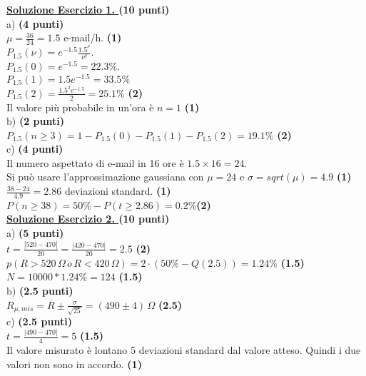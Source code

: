 \documentclass[10pt,a4paper,fleqn]{article}
\begin{document}
\vskip0.30cm {\bf \underline {Soluzione Esercizio 1. } } {\bf (10 punti)}\\
a) {\bf (4 punti)}\\
  $\mu =\frac{36}{24} = 1.5 $ e-mail/h. {\bf(1)} \\
  $P_{1.5}(\nu)=e^{-1.5}\frac{1.5^{\nu}}{\nu!}$. \\
  $P_{1.5}(0)= e^{-1.5} = 22.3\%$.\\
  $P_{1.5}(1)= 1.5 e^{-1.5} = 33.5\%$\\
  $P_{1.5}(2)= \frac{1.5^2 e^{-1.5}}{2} = 25.1\%$ {\bf (2)}\\
  Il valore pi\`u probabile in un'ora \`e $n = 1$ {\bf (1)}\\  
b) {\bf (2 punti)} \\ 
   $P_{1.5}(n\geq 3) = 1 - P_{1.5}(0) - P_{1.5}(1) - P_{1.5}(2) = 19.1\%$ {\bf (2)} \\
c) {\bf (4 punti)} \\ 
Il numero aspettato di e-mail in 16 ore \`e $1.5\times 16 = 24$. \\
Si pu\`o usare l'approssimazione gaussiana con $\mu = 24$ e $\sigma =
sqrt(\mu) = 4.9$ {\bf (1)}\\
$\frac{38-24}{4.9} = 2.86$ deviazioni standard. {\bf (1)}\\
$P(n\geq 38) = 50\% - P(t\geq 2.86) = 0.2\%${\bf (2)}\\

\vskip0.30cm {\bf \underline {Soluzione Esercizio 2. } } {\bf (10 punti)}\\
a) {\bf (5 punti)}\\
  $t=\frac{|520-470|}{20}=\frac{|420-470|}{20}=2.5$ {\bf(2)} \\
  $p(R>520 \,\Omega \, o \, R<420 \,\Omega)=2\cdot (50\%-Q(2.5))=1.24\%$ {\bf(1.5)} \\
  $N=10000*1.24\%=124$ {\bf(1.5)} \\
b) {\bf (2.5 punti)}\\
$R_{\mu,mis}=\overline{R}\pm \frac{\sigma}{\sqrt{25}}=(490\pm 4)\,\Omega$ {\bf(2.5)} \\
c) {\bf (2.5 punti)}\\
$t=\frac{|490-470|}{4}=5$ {\bf(1.5)} \\
Il valore misurato \`e lontano 5 deviazioni standard dal valore
atteso. Quindi i due valori non sono in accordo. {\bf(1)} \\
\end{document}
